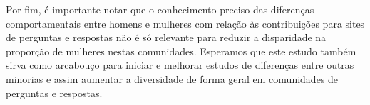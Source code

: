 
Por fim, é importante notar que o conhecimento preciso das diferenças comportamentais entre homens e mulheres com relação às contribuições para sites de perguntas e respostas não é só relevante para reduzir a disparidade na proporção de mulheres nestas comunidades. Esperamos que este estudo também sirva como arcabouço para iniciar e melhorar estudos de diferenças entre outras minorias e assim aumentar a diversidade de forma geral em comunidades de perguntas e respostas.

